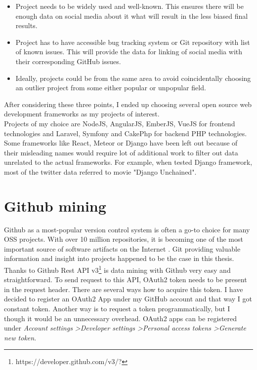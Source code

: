 \begin{itemize}
  \item Project needs to be widely used and well-known. This ensures there will be enough data on social media about it what will result in the less biased final results.
  \item Project has to have accessible bug tracking system or Git repository with list of known issues. This will provide the data for linking of social media with their corresponding GitHub issues.
  \item Ideally, projects could be from the same area to avoid coincidentally choosing an outlier project from some either popular or unpopular field.
\end{itemize}

After considering these three points, I ended up choosing several open source web development frameworks as my projects of interest. \\
Projects of my choice are NodeJS, AngularJS, EmberJS, VueJS for frontend technologies and Laravel, Symfony and CakePhp for backend PHP technologies. Some frameworks like  React, Meteor or Django have been left out because of their misleading names  would require lot of additional work to filter out data unrelated to the actual frameworks. For example, when tested Django framework, most of the twitter data referred to movie "Django Unchained".

\section{Github mining}
Github as a most-popular version control system is often a go-to choice for many OSS projects. With over 10 million repositories, it is becoming one of the most important source of software artifacts on the Internet \cite{russell2013mining}. Git providing valuable information and insight into projects happened to be the case in this thesis.\\
Thanks to Github Rest API v3\footnote{https://developer.github.com/v3/?} is data mining with Github very easy and straightforward. To send request to this API, OAuth2 token needs to be present in the request header. There are several ways how to acquire this token. I have decided to register an OAuth2 App under my GitHub account and that way I got constant token. Another way is to request a token programmatically, but I though it would be an unnecessary overhead. OAuth2 apps can be registered under \textit{Account settings \textgreater Developer settings \textgreater Personal access tokens \textgreater Generate new token}.
